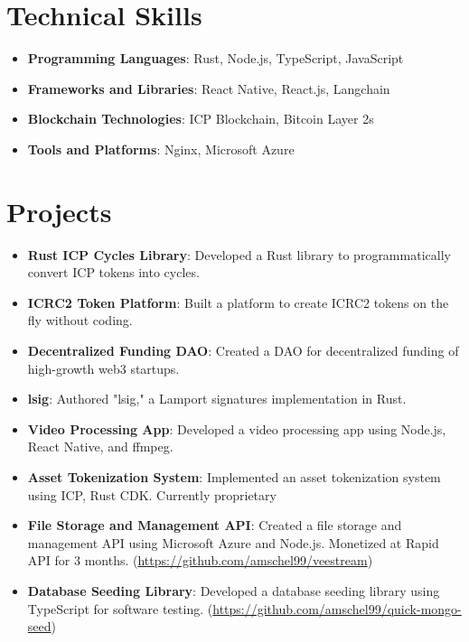 \documentclass[letterpaper,11pt]{article}
\newcommand{\resumeItem}[2]{
  \item\small{
    \textbf{#1}{: #2 \vspace{-2pt}}
  }
}
\newcommand{\resumeSubHeadingListStart}{\begin{itemize}[leftmargin=*]}
\newcommand{\resumeSubHeadingListEnd}{\end{itemize}}
\begin{document}
\section{Technical Skills}
\resumeSubHeadingListStart
\resumeItem{Programming Languages}
{Rust, Node.js, TypeScript, JavaScript}
\resumeItem{Frameworks and Libraries}
{React Native, React.js, Langchain}
\resumeItem{Blockchain Technologies}
{ICP Blockchain, Bitcoin Layer 2s}
\resumeItem{Tools and Platforms}
{Nginx, Microsoft Azure}
\resumeSubHeadingListEnd

\section{Projects}
\resumeSubHeadingListStart
\resumeItem{Rust ICP Cycles Library}
{Developed a Rust library to programmatically convert ICP tokens into cycles.}
\resumeItem{ICRC2 Token Platform}
{Built a platform to create ICRC2 tokens on the fly without coding.}
\resumeItem{Decentralized Funding DAO}
{Created a DAO for decentralized funding of high-growth web3 startups.}
\resumeItem{lsig}
{Authored "lsig," a Lamport signatures implementation in Rust.}
\resumeItem{Video Processing App}
{Developed a video processing app using Node.js, React Native, and ffmpeg.}
\resumeItem{Asset Tokenization System}
{Implemented an asset tokenization system using ICP, Rust CDK. Currently proprietary  }
\resumeItem{File Storage and Management API}
{Created a file storage and management API using Microsoft Azure and Node.js. Monetized at Rapid API for 3 months. (\href{https://github.com/amschel99/veestream}{https://github.com/amschel99/veestream})}
\resumeItem{Database Seeding Library}
{Developed a database seeding library using TypeScript for software testing. (\href{https://github.com/amschel99/quick-mongo-seed}{https://github.com/amschel99/quick-mongo-seed})}

\resumeSubHeadingListEnd

\end{document}
